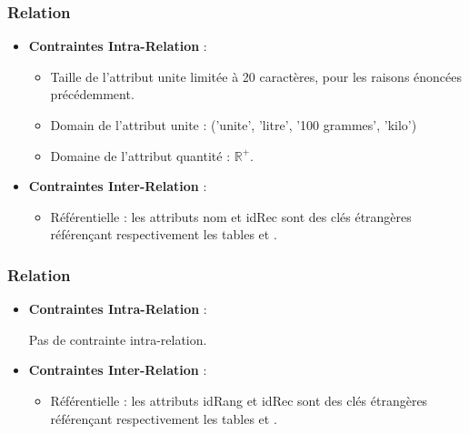 \documentclass[a4paper,10pt]{report}
\begin{document}
 \subsubsection{Relation }
 
  \begin{itemize}
 	
	\item \textbf{Contraintes Intra-Relation} :
	
	 	\begin{itemize}
			\item  Taille de l'attribut unite limitée à 20 caractères, pour les raisons énoncées précédemment.
			\item Domain de l'attribut unite : ('unite', 'litre', '100 grammes', 'kilo') 
			\item Domaine de l'attribut quantité : $\mathbb{R^+}$.\\
		 \end{itemize}
 	\item  \textbf{Contraintes Inter-Relation} :
 	
 	 	\begin{itemize}
			\item Référentielle : les attributs nom et idRec sont des clés étrangères référençant respectivement les tables  et .
		 \end{itemize}
 
 \end{itemize}
	
	
 \subsubsection{Relation }
 
  \begin{itemize}
 	
	\item \textbf{Contraintes Intra-Relation} :

		Pas de contrainte intra-relation.\\

 
 	\item  \textbf{Contraintes Inter-Relation} :
 		\begin{itemize}
			\item Référentielle : les attributs idRang et idRec sont des clés étrangères référençant respectivement les tables  et .
		 \end{itemize}
 
 
 \end{itemize}
 
\end{document}
